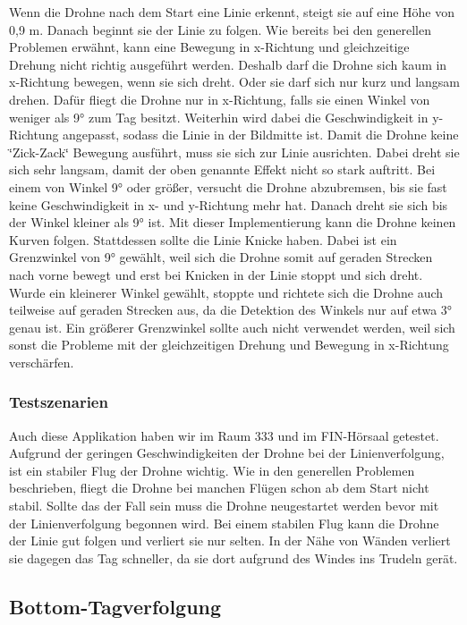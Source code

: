Wenn die Drohne nach dem Start eine Linie erkennt, steigt sie auf eine Höhe von 0,9 m. Danach beginnt sie der Linie zu folgen. Wie bereits bei den generellen Problemen erwähnt, kann eine Bewegung in x-\/Richtung und gleichzeitige Drehung nicht richtig ausgeführt werden. Deshalb darf die Drohne sich kaum in x-\/Richtung bewegen, wenn sie sich dreht. Oder sie darf sich nur kurz und langsam drehen. Dafür fliegt die Drohne nur in x-\/Richtung, falls sie einen Winkel von weniger als 9° zum Tag besitzt. Weiterhin wird dabei die Geschwindigkeit in y-\/Richtung angepasst, sodass die Linie in der Bildmitte ist. Damit die Drohne keine \char`\"{}Zick-\/Zack\char`\"{} Bewegung ausführt, muss sie sich zur Linie ausrichten. Dabei dreht sie sich sehr langsam, damit der oben genannte Effekt nicht so stark auftritt. Bei einem von Winkel 9° oder größer, versucht die Drohne abzubremsen, bis sie fast keine Geschwindigkeit in x-\/ und y-\/Richtung mehr hat. Danach dreht sie sich bis der Winkel kleiner als 9° ist. Mit dieser Implementierung kann die Drohne keinen Kurven folgen. Stattdessen sollte die Linie Knicke haben. Dabei ist ein Grenzwinkel von 9° gewählt, weil sich die Drohne somit auf geraden Strecken nach vorne bewegt und erst bei Knicken in der Linie stoppt und sich dreht. Wurde ein kleinerer Winkel gewählt, stoppte und richtete sich die Drohne auch teilweise auf geraden Strecken aus, da die Detektion des Winkels nur auf etwa 3° genau ist. Ein größerer Grenzwinkel sollte auch nicht verwendet werden, weil sich sonst die Probleme mit der gleichzeitigen Drehung und Bewegung in x-\/Richtung verschärfen.

\subsubsection*{Testszenarien }

Auch diese Applikation haben wir im Raum 333 und im FIN-\/Hörsaal getestet. Aufgrund der geringen Geschwindigkeiten der Drohne bei der Linienverfolgung, ist ein stabiler Flug der Drohne wichtig. Wie in den generellen Problemen beschrieben, fliegt die Drohne bei manchen Flügen schon ab dem Start nicht stabil. Sollte das der Fall sein muss die Drohne neugestartet werden bevor mit der Linienverfolgung begonnen wird. Bei einem stabilen Flug kann die Drohne der Linie gut folgen und verliert sie nur selten. In der Nähe von Wänden verliert sie dagegen das Tag schneller, da sie dort aufgrund des Windes ins Trudeln gerät.

\subsection*{Bottom-\/Tagverfolgung }

